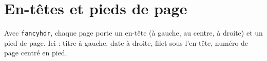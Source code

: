 \documentclass{article}
\begin{document}
\hsize=380pt
\pagestyle{fancy}
\rhead{\today}
\section{En-t\^etes et pieds de page}
Avec \texttt{fancyhdr}, chaque page porte un en-t\^ete (\`a gauche, au centre, \`a droite) et un pied de page. Ici : titre \`a gauche, date \`a droite, filet sous l'en-t\^ete, num\'ero de page centr\'e en pied.
\end{document}
